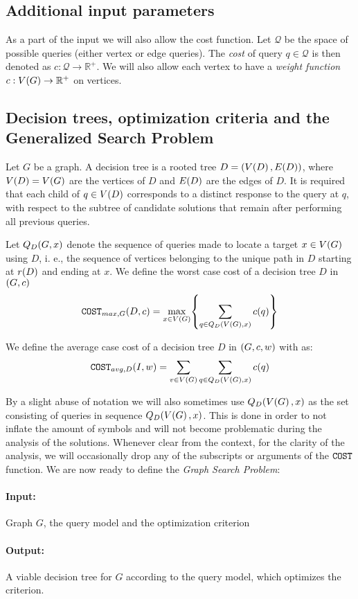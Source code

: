 \subsection{Additional input parameters}
As a part of the input we will also allow the cost function. Let $\mathcal{Q}$ be the space of possible queries (either vertex or edge queries). The \textit{cost} of query $q\in\mathcal{Q}$ is then denoted
as $c:\mathcal{Q}\to \mathbb{R}^+$. We will also allow each vertex to have a \textit{weight function} $c:V\mathopen{}\left( G \right)\to \mathbb{R}^+$ on vertices.
\subsection{Decision trees, optimization criteria and the Generalized Search Problem}
Let $G$ be a graph. A decision tree is a rooted tree $D=(V\mathopen{}\left( D \right), E\mathopen{}\left( D \right))$, where $V\mathopen{}\left( D \right)=V\mathopen{}\left( G \right)$ are the vertices of $D$ and $E\mathopen{}\left( D \right)$ are the edges of $D$. It is required that each child of $q\in V\mathopen{}\left( D \right)$ corresponds to a distinct response to the query at $q$, with respect to the subtree of candidate solutions that remain after performing all previous queries. 

Let $Q_D\mathopen{}\left( G,x \right)$ denote the sequence of queries made to locate a target $x \in V\mathopen{}\left( G \right)$ using $D$, i. e., the sequence of vertices belonging to the unique path in $D$ starting at $r\mathopen{}\left( D \right)$ and ending at $x$. We define the worst case cost of a decision tree $D$ in $\mathopen{}\left( G,c \right)$
$$
\texttt{COST}_{max, G}\mathopen{}\left( D, c \right) = \max_{x\in V\mathopen{}\left( G \right)} \mathopen{}\left\{ \sum_{q\in Q_D\mathopen{}\left( V\mathopen{}\left( G \right),x \right)}c\mathopen{}\left( q \right) \right\}
$$

We define the average case cost of a decision tree $D$ in $\mathopen{}\left( G,c,w \right)$ with as:
$$
\texttt{COST}_{avg, D}\mathopen{}\left( I, w \right) = \sum_{v\in V\mathopen{}\left( G \right)}\sum_{q\in Q_D\mathopen{}\left( V\mathopen{}\left( G \right),x \right)}c\mathopen{}\left( q \right)
$$

By a slight abuse of notation we will also sometimes use $Q_D\mathopen{}\left( V\mathopen{}\left( G \right),x \right)$ as the set consisting of queries in sequence $Q_D\mathopen{}\left( V\mathopen{}\left( G \right),x \right)$. This is done in order to not inflate the amount of symbols and will not become problematic during the analysis of the solutions.
Whenever clear from the context, for the clarity of the analysis, we will occasionally drop any of the subscripts or arguments of the $\texttt{COST}$ function.
We are now ready to define the \textit{Graph Search Problem}:

\begin{tcolorbox}[colback=white, title=Generalized Search Problem, fonttitle=\bfseries, breakable]
\paragraph{Input:} Graph $G$, the query model and the optimization criterion
\paragraph{Output:} A viable decision tree for $G$ according to the query model, which optimizes the criterion.
\end{tcolorbox}